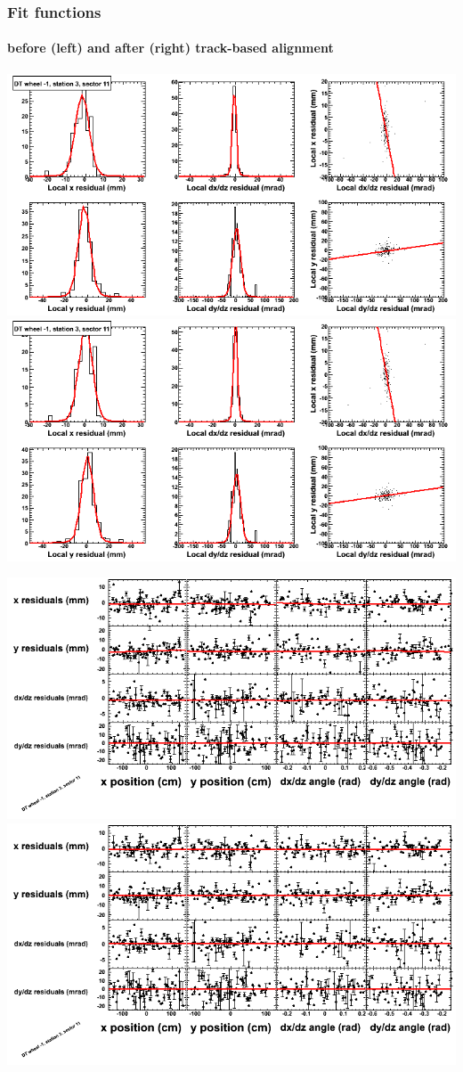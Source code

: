 \documentclass[compress]{beamer}
\begin{document}
\begin{frame}
\frametitle{Fit functions}
\framesubtitle{before (left) and after (right) track-based alignment}
\includegraphics[width=0.5\linewidth]{fitfunctions_re01/MBwhBst3sec11_bellcurves.png} \includegraphics[width=0.5\linewidth]{fitfunctions_re05/MBwhBst3sec11_bellcurves.png}

\includegraphics[width=0.5\linewidth]{fitfunctions_re01/MBwhBst3sec11_polynomials.png} \includegraphics[width=0.5\linewidth]{fitfunctions_re05/MBwhBst3sec11_polynomials.png}
\end{frame}
\end{document}
